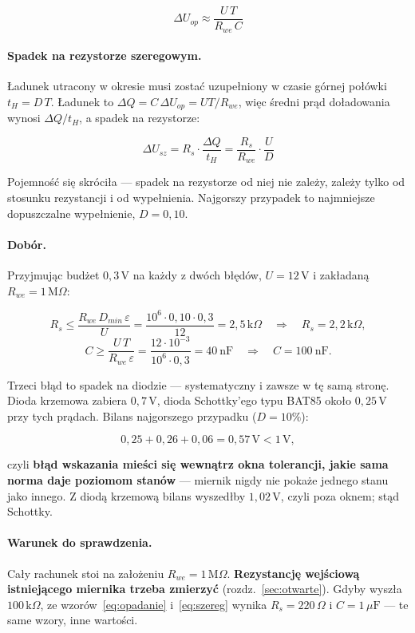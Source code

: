\documentclass[a4paper,11pt]{article}
\newcommand{\ohm}{\,\Omega}
\newcommand{\kohm}{\,\mathrm{k}\Omega}
\newcommand{\Mohm}{\,\mathrm{M}\Omega}
\newcommand{\volt}{\,\mathrm{V}}
\begin{document}
\begin{equation}
\Delta U_{op}\approx\frac{U\,T}{R_{we}\,C}
\label{eq:opadanie}
\end{equation}

\paragraph{Spadek na rezystorze szeregowym.} Ładunek utracony w okresie musi zostać
uzupełniony w czasie górnej połówki $t_H = D\,T$. Ładunek to
$\Delta Q = C\,\Delta U_{op} = U T/R_{we}$, więc średni prąd doładowania wynosi
$\Delta Q/t_H$, a spadek na rezystorze:

\begin{equation}
\Delta U_{sz}=R_s\cdot\frac{\Delta Q}{t_H}=\frac{R_s}{R_{we}}\cdot\frac{U}{D}
\label{eq:szereg}
\end{equation}

Pojemność się skróciła --- spadek na rezystorze od niej nie zależy, zależy tylko od
stosunku rezystancji i od wypełnienia. Najgorszy przypadek to najmniejsze
dopuszczalne wypełnienie, $D=0{,}10$.

\paragraph{Dobór.} Przyjmując budżet $0{,}3\volt$ na każdy z dwóch błędów,
$U=12\volt$ i zakładaną $R_{we}=1\Mohm$:

\[
R_s \le \frac{R_{we}\,D_{min}\,\varepsilon}{U}
     = \frac{10^6\cdot0{,}10\cdot0{,}3}{12}=2{,}5\kohm
\quad\Rightarrow\quad R_s = 2{,}2\kohm,
\]
\[
C \ge \frac{U\,T}{R_{we}\,\varepsilon}
   = \frac{12\cdot10^{-3}}{10^{6}\cdot0{,}3}=40\ \mathrm{nF}
\quad\Rightarrow\quad C = 100\ \mathrm{nF}.
\]

Trzeci błąd to spadek na diodzie --- systematyczny i zawsze w tę samą stronę.
Dioda krzemowa zabiera $0{,}7\volt$, dioda Schottky'ego typu BAT85 około
$0{,}25\volt$ przy tych prądach. Bilans najgorszego przypadku ($D=10\%$):

\[
0{,}25 + 0{,}26 + 0{,}06 = 0{,}57\volt < 1\volt ,
\]

czyli \textbf{błąd wskazania mieści się wewnątrz okna tolerancji, jakie sama norma
daje poziomom stanów} --- miernik nigdy nie pokaże jednego stanu jako innego.
Z diodą krzemową bilans wyszedłby $1{,}02\volt$, czyli poza oknem; stąd Schottky.

\paragraph{Warunek do sprawdzenia.} Cały rachunek stoi na założeniu
$R_{we}=1\Mohm$. \textbf{Rezystancję wejściową istniejącego miernika trzeba
zmierzyć} (rozdz.~\ref{sec:otwarte}). Gdyby wyszła $100\kohm$, ze
wzorów~\eqref{eq:opadanie} i~\eqref{eq:szereg} wynika $R_s=220\ohm$
i $C=1\,\mu\mathrm{F}$ --- te same wzory, inne wartości.
\end{document}
